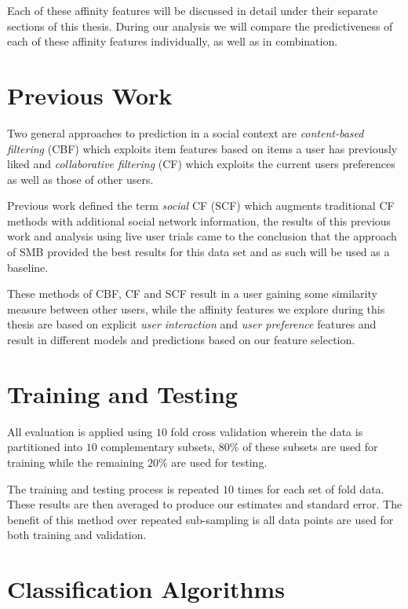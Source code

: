Each of these affinity features will be discussed in detail under their separate sections of this thesis.
During our analysis we will compare the predictiveness of each of these affinity features individually, as well as in combination.

\section{Previous Work}
\label{sec:pw}

Two general approaches to prediction in a social context are \emph{content-based filtering} (CBF) \cite{newsweeder} which exploits 
item features based on items a user has previously liked and  \emph{collaborative filtering} (CF) 
\cite{collab_filtering} which exploits the current users preferences as well as those of other users. 

Previous work defined the term \emph{social} CF (SCF) \cite{joseph} which augments traditional CF methods with additional social 
network information, the results of this previous work and analysis using live user trials came to the conclusion that the approach of SMB
provided the best results for this data set and as such will be used as a baseline.

These methods of CBF, CF and SCF result in a user gaining some similarity measure between other users, while the affinity features we 
explore during this thesis are based on explicit \emph{user interaction} and \emph{user preference} features and result in different 
models and predictions based on our feature selection.

\section{Training and Testing}
\label{sec:tt}

All evaluation is applied using $10$ fold cross validation wherein the data is partitioned into $10$ complementary subsets, $80\%$ of 
these subsets are used for training while the remaining $20\%$ are used for testing.

The training and testing process is repeated $10$ times for each set of fold data. These results are then averaged to produce our 
estimates and standard error. The benefit of this method over repeated sub-sampling is all data points are used for both training 
and validation.

\section{Classification Algorithms}
\label{sec:meth}

